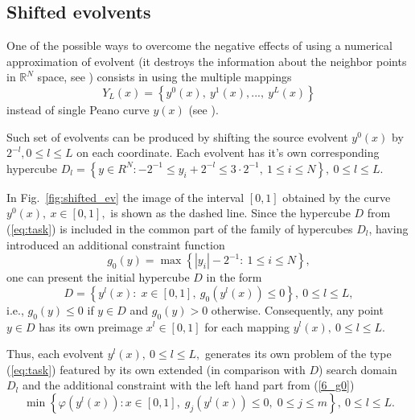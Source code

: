 \documentclass[3p,times,procedia]{elsarticle}
\begin{document}
\subsection{Shifted evolvents}
\label{sec:shifted}

One of the possible ways to overcome the negative effects of using a numerical
approximation of evolvent (it destroys the information about the neighbor points in $\mathbb{R}^N$ space,
see \cite{Strongin1992}) consists in using the multiple mappings
\begin{equation}%
Y_L(x)=\left\{y^0(x),\ y^1(x),...,\ y^L(x)\right\}
\end{equation}
instead of single Peano curve $y(x)$ (see \cite{Strongin1992,strSergGO,Strongin1991}).

Such set of evolvents can be produced by shifting the source evolvent $y^0(x)$ by $2^{-l},0
\leq l \leq L$ on each coordinate. Each evolvent has it's own corresponding hypercube $D_l=
\left\{y \in R^N: -2^{-1} \leq y_i+2^{-l} \leq 3 \cdot 2^{-1},\ 1\leq i\leq N\right\},\ 0 \leq l \leq
L$.

In Fig.~\ref{fig:shifted_ev} the image of the interval $[0,1]$ obtained by the curve $y^0(x),\
x\in [0,1],$ is shown as the dashed line. Since the hypercube $D$ from (\ref{eq:task}) is
included in the common part of the family of hypercubes $D_l$, having introduced an additional constraint
function
\begin{equation}\label{6_g0}
g_0(y)=\max\left\{\left|y_i\right| - 2^{-1}:\ 1\leq i\leq N\right\},
\end{equation}
one can present the initial hypercube $D$ in the form
\[
D=\left\{y^l(x):\; x\in [0,1],\ g_0(y^l(x))\leq 0 \right\},\ 0\leq l \leq L,
\]
i.e., $g_0(y) \leq 0$ if $y\in D$ and $g_0(y)>0$ otherwise. Consequently, any point $y \in D$
has its own preimage $x^l \in [0,1]$ for each mapping $y^l(x),\ 0\leq l\leq L$.

Thus, each evolvent $y^l(x),\ 0\leq l \leq L,$ generates its own problem of the type
(\ref{eq:task}) featured by its own extended (in comparison with $D$) search domain $D_l$
and the additional constraint with the left hand part from (\ref{6_g0})
\begin{equation}\label{6_problem_l}
\min{\left\{\varphi(y^l(x)):x\in [0,1], \; g_j(y^l(x))\leq 0, \; 0 \leq j \leq m\right\}}, \ 0 \leq l \leq L.
\end{equation}
\end{document}
